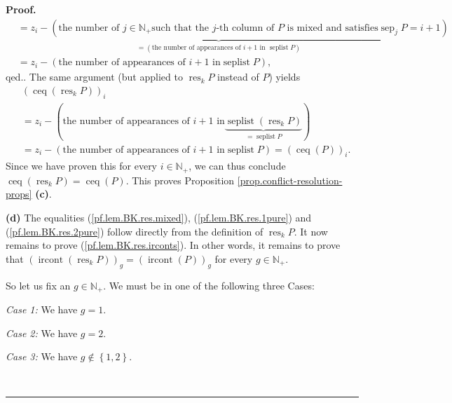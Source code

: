 \documentclass[numbers=enddot,12pt,final,onecolumn,notitlepage]{scrartcl}%
\theoremstyle{definition}
\newenvironment{proof}[1][Proof]{\noindent\textbf{#1.} }{\ \rule{0.5em}{0.5em}}
\begin{document}
\begin{proof}
{\begin{align*}
&  =z_{i}-\underbrace{\left(  \text{the number of }j\in\mathbb{N}_{+}\text{
such that the }j\text{-th column of }P\text{ is mixed and satisfies
}\operatorname*{sep}\nolimits_{j}P=i+1\right)  }_{=\left(  \text{the number of
appearances of }i+1\text{ in }\operatorname*{seplist}P\right)  }\\
&  =z_{i}-\left(  \text{the number of appearances of }i+1\text{ in
}\operatorname*{seplist}P\right)  ,
\end{align*}
qed.}. The same argument (but applied to $\operatorname*{res}\nolimits_{k}P$
instead of $P$) yields%
\begin{align*}
&  \left(  \operatorname*{ceq}\left(  \operatorname*{res}\nolimits_{k}%
P\right)  \right)  _{i}\\
&  =z_{i}-\left(  \text{the number of appearances of }i+1\text{ in
}\underbrace{\operatorname*{seplist}\left(  \operatorname*{res}\nolimits_{k}%
P\right)  }_{=\operatorname*{seplist}P}\right) \\
&  =z_{i}-\left(  \text{the number of appearances of }i+1\text{ in
}\operatorname*{seplist}P\right)  =\left(  \operatorname*{ceq}\left(
P\right)  \right)  _{i}.
\end{align*}
Since we have proven this for every $i\in\mathbb{N}_{+}$, we can thus conclude
$\operatorname*{ceq}\left(  \operatorname*{res}\nolimits_{k}P\right)
=\operatorname*{ceq}\left(  P\right)  $. This proves Proposition
\ref{prop.conflict-resolution-props} \textbf{(c)}.

\textbf{(d)} The equalities (\ref{pf.lem.BK.res.mixed}),
(\ref{pf.lem.BK.res.1pure}) and (\ref{pf.lem.BK.res.2pure}) follow directly
from the definition of $\operatorname*{res}\nolimits_{k}P$. It now remains to
prove (\ref{pf.lem.BK.res.irconts}). In other words, it remains to prove that
$\left(  \operatorname*{ircont}\left(  \operatorname*{res}\nolimits_{k}%
P\right)  \right)  _{g}=\left(  \operatorname*{ircont}\left(  P\right)
\right)  _{g}$ for every $g\in\mathbb{N}_{+}$.

So let us fix an $g\in\mathbb{N}_{+}$. We must be in one of the following
three Cases:

\textit{Case 1:} We have $g=1$.

\textit{Case 2:} We have $g=2$.

\textit{Case 3:} We have $g\notin\left\{  1,2\right\}  $.


\end{proof}
\end{document}
